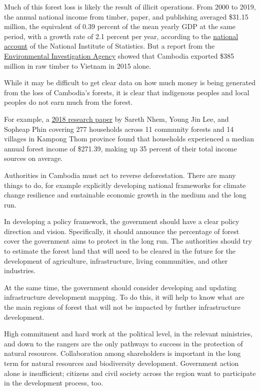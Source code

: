 \documentclass[10pt,a4paper]{letter}
\begin{document}
Much of this forest loss is likely the result of illicit operations. From 2000 to 2019, the annual national income from timber, paper, and publishing averaged \$31.15 million, the equivalent of 0.39 percent of the mean yearly GDP at the same period, with a growth rate of 2.1 percent per year, according to the \href{https://www.nis.gov.kh/index.php/km/21-na/41-national-accounts}{national account} of the National Institute of Statistics. But a report from the \href{https://eia-international.org/wp-content/uploads/Repeat-Offender.pdf}{Environmental Investigation Agency} showed that Cambodia exported \$385 million in raw timber to Vietnam in 2015 alone. 

While it may be difficult to get clear data on how much money is being generated from the loss of Cambodia's forests, it is clear that indigenous peoples and local peoples do not earn much from the forest.  

For example, a \href{https://www.tandfonline.com/doi/full/10.1080/21580103.2018.1520744}{2018 research paper} by Sareth Nhem, Young Jin Lee, and Sopheap Phin covering 277 households across 11 community forests and 14 villages in Kampong Thom province found that households experienced a median annual forest income of \$271.39, making up 35 percent of their total income sources on average. 

Authorities in Cambodia must act to reverse deforestation. There are many things to do, for example explicitly developing national frameworks for climate change resilience and sustainable economic growth in the medium and the long run.
   
In developing a policy framework, the government should have a clear policy direction and vision. Specifically, it should announce the percentage of forest cover the government aims to protect in the long run. The authorities should try to estimate the forest land that will need to be cleared in the future for the development of agriculture, infrastructure, living communities, and other industries.

At the same time, the government should consider developing and updating infrastructure development mapping. To do this, it will help to know what are the main regions of forest that will not be impacted by further infrastructure development.  

High commitment and hard work at the political level, in the relevant ministries, and down to the rangers are the only pathways to success in the protection of natural resources. Collaboration among shareholders is important in the long term for natural resources and biodiversity development. Government action alone is insufficient; citizens and civil society across the region want to participate in the development process, too.
\end{document}
